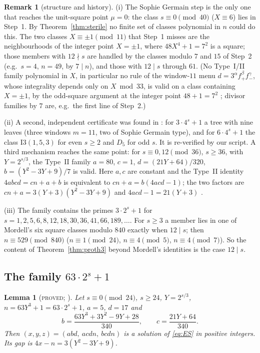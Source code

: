 \documentclass[11pt,reqno]{amsart}
\newtheorem{lemma}[theorem]{Lemma}
\theoremstyle{definition}
\newtheorem{remark}[theorem]{Remark}
\newcommand{\status}[1]{\textup{\textsc{#1}}}
\begin{document}
\begin{remark}[structure and history]\label{rem:proth3}
(i) The Sophie Germain step is the only one that reaches the unit-square
point $\mu=0$: the class $s\equiv0\pmod{40}$ ($X\equiv6$) lies in Step~1.
By Theorem~\ref{thm:sterile} no finite set of classes polynomial in $n$ could
do this.  The two classes $X\equiv\pm1\pmod{11}$ that Step~1 misses are the
neighbourhoods of the integer point $X=\pm1$, where $48X^4+1=7^2$ is a
square; those members with $12\nmid s$ are handled by the classes modulo $7$
and $15$ of Step~2 (e.g.\ $s=4$, $n=49$, by $7\mid n$), and those with
$12\mid s$ through $61$.  (No Type~I/II family polynomial in $X$, in
particular no rule of the window-$11$ menu $d=3^\alpha f_+^\beta f_-^\gamma$,
whose integrality depends only on $X\bmod 33$, is valid on a class
containing $X=\pm1$, by the odd-square argument at the integer point
$48+1=7^2$ \cite[\S4.3]{MenuSterility}; divisor families by $7$ are, e.g.\
the first line of Step~2.)%

(ii) A second, independent certificate was found in \cite[Thms.~2.2,
2.3]{Exp105}: for $3\cdot4^s+1$ a tree with nine leaves (three windows
$m=11$, two of Sophie Germain type), and for $6\cdot4^s+1$ the class
I3$(1,5,3)$ for even $s\ge2$ and $D_5$ for odd $s$.  It is re-verified by our script.  A third
mechanism reaches the same point: for $s\equiv0,12\pmod{36}$, $s\ge36$, with
$Y=2^{s/3}$, the Type~II family $a=80$, $c=1$, $d=(21Y+64)/320$,
$b=(Y^2-3Y+9)/7$ is valid.  Here $a,c$ are constant and the Type~II identity
$4abcd=cn+a+b$ is equivalent to $cn+a=b(4acd-1)$; the two factors are
$cn+a=3(Y+3)(Y^2-3Y+9)$ and $4acd-1=21(Y+3)$ \cite[Prop.~2.1]{ExpOpen}.

(iii) The family contains the primes $3\cdot2^s+1$ for
$s=1,2,5,6,8,12,18,30,36,41,66,189,\dots$.  For $s\ge3$ a member lies in one
of Mordell's six square classes modulo $840$ exactly when $12\mid s$; then
$n\equiv529\pmod{840}$ ($n\equiv1\pmod{24}$, $n\equiv4\pmod5$,
$n\equiv4\pmod7$).  So the content of Theorem~\ref{thm:proth3} beyond
Mordell's identities is the case $12\mid s$.
\end{remark}

\subsection{The family $63\cdot2^s+1$}

\begin{lemma}[\status{proved}; {\cite[Thm.~2.3]{ExpOpen}}]\label{lem:63class}
Let $s\equiv0\pmod{24}$, $s\ge24$, $Y=2^{s/3}$, $n=63Y^3+1=63\cdot2^s+1$,
$a=5$, $d=17$ and
\[
 b=\frac{63Y^3+3Y^2-9Y+28}{340},\qquad c=\frac{21Y+64}{340}.
\]
Then $(x,y,z)=(abd,\ acdn,\ bcdn)$ is a solution of \eqref{eq:ES} in positive
integers.  Its gap is $4x-n=3(Y^2-3Y+9)$.
\end{lemma}
\end{document}
